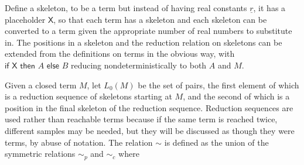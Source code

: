 \documentclass{article}
\newcommand{\tif}[3]{\textsf{if }#1\textsf{ then }#2\textsf{ else }#3}
\newcommand{\skeletonPlaceholder}{\textsf{X}} %
\theoremstyle{definition}
\theoremstyle{lemma}
\theoremstyle{remark}
\begin{document}
Define a skeleton, to be a term but instead of having real constants $\underline r$, it has a placeholder $\skeletonPlaceholder$, so that each term has a skeleton and each skeleton can be converted to a term given the appropriate number of real numbers to substitute in. The positions in a skeleton and the reduction relation on skeletons can be extended from the definitions on terms in the obvious way, with $\tif{\skeletonPlaceholder}{A}{B}$ reducing nondeterministically to both $A$ and $M$.

Given a closed term $M$, let $L_0(M)$ be the set of pairs, the first element of which is a reduction sequence of skeletons starting at $M$, and the second of which is a position in the final skeleton of the reduction sequence.  Reduction sequences are used rather than reachable terms because if the same term is reached twice, different samples may be needed, but they will be discussed as though they were terms, by abuse of notation.  The relation $\sim$ is defined as the union of the symmetric relations $\sim_p$  and $\sim_c$  where
\end{document}
